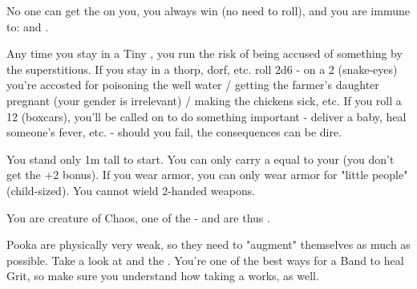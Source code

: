\begin{multicols*}{2}
  
    No one can get the  on you, you always win  (no need to roll), and you are immune to:  and .




  Any time you stay in a Tiny , you run the risk of being accused of something by the superstitious.  If you stay in a  thorp, dorf, etc. roll 2d6 - on a 2 (snake-eyes) you're accosted for poisoning the well water / getting the farmer's daughter pregnant (your gender is irrelevant) / making the chickens sick, etc. If you roll a 12 (boxcars), you'll be called on to do something important - deliver a baby, heal someone's fever, etc. - should you fail, the consequences can be dire.

\cbreak


  You stand only 1m tall to start.  You can only carry a  equal to your \VIG (you don't get the +2 bonus). If you wear armor, you can only wear armor for "little people" (child-sized).  You cannot wield 2-handed weapons.

    
  You are creature of Chaos, one of the  - and are thus .





 

    Pooka are physically very weak, so they need to "augment" themselves as much as possible. Take a look at  and the . You're one of the best ways for a Band to heal Grit, so make sure you understand how taking a  works, as well.


\end{multicols*}
